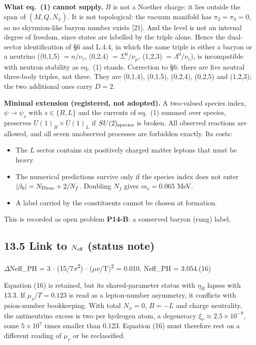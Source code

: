 \documentclass[11pt,letterpaper]{article}
\begin{document}
\noindent \textbf{What eq.~(1) cannot supply. }$B$ is not a Noether charge: it lies outside the span of $(M,Q,N_\psi)$. It is not topological: the vacuum manifold has $\pi_2=\pi_3=0$, so no skyrmion-like baryon number exists [21]. And the level is not an internal degree of freedom, since states are labelled by the triple alone. Hence the dual-sector identification of \S6 and L.4.4, in which the same triple is either a baryon or a neutrino ((0,1,5) $=n/\nu_\tau$, (0,2,4) $=\Sigma^0/\nu_\mu$, (1,2,3) $=\Lambda^0/\nu_e$), is incompatible with neutron stability as eq.~(1) stands. Correction to \S6: there are five neutral three-body triples, not three. They are (0,1,4), (0,1,5), (0,2,4), (0,2,5) and (1,2,3); the two additional ones carry $D=2$.

\noindent \textbf{Minimal extension (registered, not adopted). }A two-valued species index, $\psi\to\psi_s$ with $s\in\{B,L\}$ and the currents of eq.~(1) summed over species, preserves $U(1)_B\times U(1)_L$ if $SU(2)_{\rm species}$ is broken. All observed reactions are allowed, and all seven unobserved processes are forbidden exactly. Its costs:
\begin{itemize}
\item The $L$ sector contains six positively charged matter leptons that must be heavy.
\item The numerical predictions survive only if the species index does not enter $|\beta_0|=N_{\rm Dirac}+2/N_f$. Doubling $N_f$ gives $m_e=0.065$ MeV.
\item A label carried by the constituents cannot be chosen at formation.
\end{itemize}
This is recorded as open problem \textbf{P14-B}: a conserved baryon (rung) label.

\subsection*{13.5  Link to $N_{\rm eff}$ (status note)}

\begingroup\centering $\Delta$Neff\_PH = 3 $\cdot$ (15/7$\pi$\textsuperscript{2}) $\cdot$ ($\mu$$\nu$/T)\textsuperscript{2} = 0.010,   Neff\_PH = 3.054.\hspace{2em}(16)\par\endgroup

\noindent Equation (16) is retained, but its shared-parameter status with $\eta_B$ lapses with 13.3. If $\mu_\nu/T=0.123$ is read as a lepton-number asymmetry, it conflicts with psion-number bookkeeping. With total $N_\psi=0$, $B=-L$ and charge neutrality, the antineutrino excess is two per hydrogen atom, a degeneracy $\xi_\nu\approx2.5\times10^{-9}$, some $5\times10^7$ times smaller than 0.123. Equation (16) must therefore rest on a different reading of $\mu_\nu$ or be reclassified.
\end{document}

